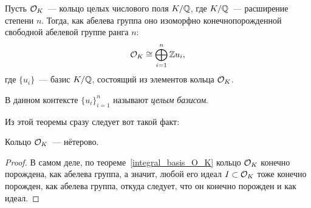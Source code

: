 	\begin{theorem}\label{integral_basis_O_K} 
		Пусть $\mathcal{O}_{K}$~--- кольцо целых числового поля $K/\mathbb{Q}$, где $K/\mathbb{Q}$~--- расширение степени $n$. Тогда, как абелева группа оно изоморфно конечнопорожденной свободной абелевой группе ранга $n$:
		\[
			\mathcal{O}_{K} \cong \bigoplus_{i = 1}^{n} \mathbb{Z} u_i,
		\]
		где $\{ u_i \}$~--- базис $K/\mathbb{Q}$, состоящий из элементов кольца $\mathcal{O}_{K}$. 

		В данном контексте $\{ u_i \}_{i = 1}^{n}$ называют \emph{целым базисом}. 
	\end{theorem}

	Из этой теоремы сразу следует вот такой факт:

	\begin{theorem} 
		Кольцо $\mathcal{O}_{K}$~--- нётерово. 
	\end{theorem}
	\begin{proof}
		В самом деле, по теореме~\ref{integral_basis_O_K} кольцо $\mathcal{O}_{K}$ конечно порождена, как абелева группа, а значит, любой его идеал $I \subset \mathcal{O}_K$ тоже конечно порожден, как абелева группа, откуда следует, что он конечно порожден и как идеал. 
	\end{proof}

